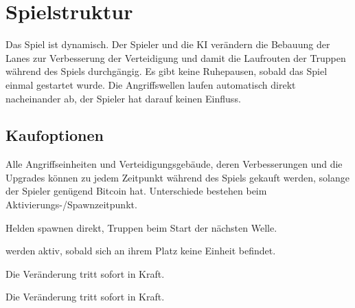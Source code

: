 \section{Spielstruktur}

%
%
%
%

Das Spiel ist dynamisch. Der Spieler und die KI verändern die Bebauung der
Lanes zur Verbesserung der Verteidigung und damit die Laufrouten der Truppen
während des Spiels durchgängig. Es gibt keine Ruhepausen, sobald das Spiel
einmal gestartet wurde. Die Angriffswellen laufen automatisch direkt
nacheinander ab, der Spieler hat darauf keinen Einfluss.

\subsection{Kaufoptionen}
\label{subsec:kaufoptionen}
    Alle Angriffseinheiten und Verteidigungsgebäude, deren Verbesserungen und
    die Upgrades können zu jedem Zeitpunkt während des Spiels gekauft werden, 
    solange der Spieler genügend Bitcoin hat. Unterschiede bestehen beim 
    Aktivierungs-/Spawnzeitpunkt.

  \begin{description}[noitemsep]
    \item[Angriffseinheiten] Helden spawnen direkt, Truppen beim
      Start der nächsten Welle.
    \item[Verteidigungsgebäude] werden aktiv, sobald sich an ihrem Platz keine
      Einheit befindet.
		\item[Verbesserungen] Die Veränderung tritt sofort in Kraft.
		\item[Upgrades] Die Veränderung tritt sofort in Kraft.
	\end{description}

